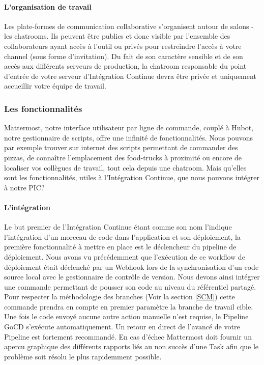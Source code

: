           \paragraph{L'organisation de travail}
          Les plate-formes de communication collaborative s'organisent autour de salons - les chatrooms. Ils peuvent être publics et donc visible par l'ensemble des collaborateurs ayant accès à l'outil ou privés pour restreindre l'accès à votre channel (sous forme d'invitation). Du fait de son caractère sensible et de son accès aux différents serveurs de production, la chatroom responsable du point d'entrée de votre serveur d'Intégration Continue devra être privée et uniquement accueillir votre équipe de travail.

        \subsubsection{Les fonctionnalités}
        Mattermost, notre interface utilisateur par ligne de commande, couplé à Hubot, notre gestionnaire de scripts, offre une infinité de fonctionnalités. Nous pouvons par exemple trouver sur internet des scripts permettant de commander des pizzas, de connaître l'emplacement des food-trucks à proximité ou encore de localiser vos collègues de travail, tout cela depuis une chatroom. Mais qu'elles sont les fonctionnalités, utiles à l'Intégration Continue, que nous pouvons intégrer à notre PIC?

          \paragraph{L'intégration} Le but premier de l'Intégration Continue étant comme son nom l'indique l'intégration d'un morceau de code dans l'application et son déploiement, la première fonctionnalité à mettre en place est le déclencheur du pipeline de déploiement. Nous avons vu précédemment que l'exécution de ce workflow de déploiement était déclenché par un Webhook lors de la synchronisation d'un code source local avec le gestionnaire de contrôle de version. Nous devons ainsi intégrer une commande permettant de pousser son code au niveau du référentiel partagé. Pour respecter la méthodologie des branches (Voir la section \ref{SCM}) cette commande prendra en compte en premier paramètre la branche de travail cible. Une fois le code envoyé aucune autre action manuelle n'est requise, le Pipeline GoCD s'exécute automatiquement. Un retour en direct de l'avancé de votre Pipeline est fortement recommandé. En cas d'échec Mattermost doit fournir un apercu graphique des différents rapports liés au non succès d'une Task afin que le problème soit résolu le plus rapidemment possible.

